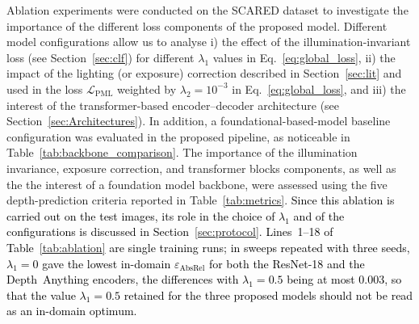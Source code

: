 \documentclass[a4paper,fleqn]{cas-dc}
\begin{document}
{Ablation experiments were conducted on the SCARED dataset to investigate the importance of the different loss components of the proposed model. Different model configurations allow us to analyse i) the effect of the illumination-invariant loss (see Section~\ref{sec:clf}) for different $\lambda_1$ values in Eq.~\eqref{eq:global_loss}, ii) the impact of the lighting (or exposure) correction described in Section~\ref{sec:lit} and used in the loss $\mathcal{L}_\textrm{PML}$ weighted by $\lambda_2 = 10^{-3}$ in Eq.~\eqref{eq:global_loss}, and iii) the interest of the transformer-based encoder–decoder architecture (see Section~\ref{sec:Architectures}). In addition, a foundational-based-model baseline configuration was evaluated in the proposed pipeline, as noticeable in Table~\ref{tab:backbone_comparison}. The importance of the illumination invariance, exposure correction, and transformer blocks components, as well as the the interest of a foundation model backbone, were assessed using the five depth-prediction criteria reported in Table~\ref{tab:metrics}. \textcolor{black}{Since this ablation is carried out on the test images, its role in the choice of $\lambda_1$ and of the configurations is discussed in Section~\ref{sec:protocol}. Lines~1--18 of Table~\ref{tab:ablation} are single training runs; in sweeps repeated with three seeds, $\lambda_1 = 0$ gave the lowest in-domain $\varepsilon_\textrm{AbsRel}$ for both the ResNet-18 and the Depth~Anything encoders, the differences with $\lambda_1 = 0.5$ being at most 0.003, so that the value $\lambda_1 = 0.5$ retained for the three proposed models should not be read as an in-domain optimum.}  

}
\end{document}
